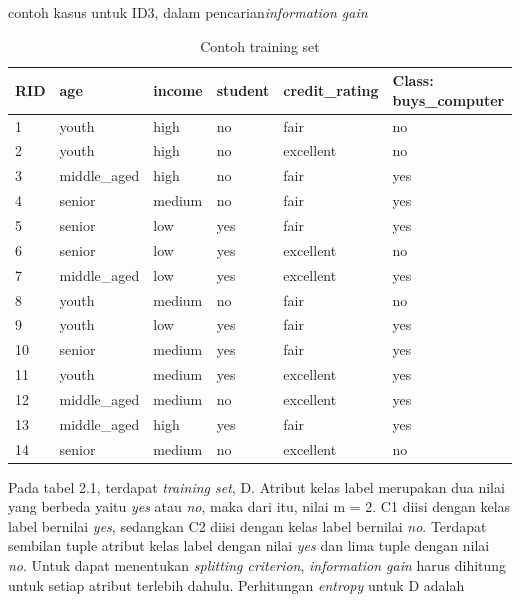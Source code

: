 contoh kasus untuk ID3, dalam pencarian\textsl{information gain}

\begin{table}[h]
\caption{Contoh training set}
\begin{tabular}{|l|l|l|l|l|l|}
\hline
RID & age          & income & student & credit\_rating & Class: buys\_computer \\ \hline
1   & youth        & high   & no      & fair           & no                    \\ \hline
2   & youth        & high   & no      & excellent      & no                    \\ \hline
3   & middle\_aged & high   & no      & fair           & yes                   \\ \hline
4   & senior       & medium & no      & fair           & yes                   \\ \hline
5   & senior       & low    & yes     & fair           & yes                   \\ \hline
6   & senior       & low    & yes     & excellent      & no                    \\ \hline
7   & middle\_aged & low    & yes     & excellent      & yes                   \\ \hline
8   & youth        & medium & no      & fair           & no                    \\ \hline
9   & youth        & low    & yes     & fair           & yes                   \\ \hline
10  & senior       & medium & yes     & fair           & yes                   \\ \hline
11  & youth        & medium & yes     & excellent      & yes                   \\ \hline
12  & middle\_aged & medium & no      & excellent      & yes                   \\ \hline
13  & middle\_aged & high   & yes     & fair           & yes                   \\ \hline
14  & senior       & medium & no      & excellent      & no                    \\ \hline
\end{tabular}
\end{table}

Pada tabel 2.1, terdapat \textsl{training set}, D. Atribut kelas label merupakan dua nilai yang berbeda yaitu \textsl{yes} atau \textsl{no}, maka dari itu, nilai m = 2. C1 diisi dengan kelas label bernilai \textsl{yes}, sedangkan C2 diisi dengan kelas label bernilai \textsl{no}. Terdapat sembilan tuple atribut kelas label dengan nilai \textsl{yes} dan lima tuple dengan nilai \textsl{no}. Untuk dapat menentukan \textsl{splitting criterion}, \textsl{information gain} harus dihitung untuk setiap atribut terlebih dahulu. Perhitungan \textsl{entropy} untuk D adalah

